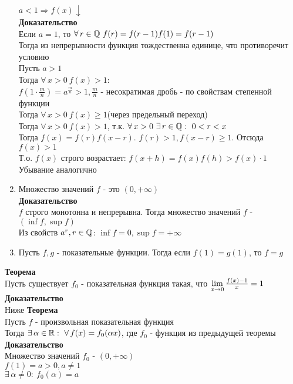 \documentclass[12pt]{article}
\begin{document}
\begin{enumerate}
    $a < 1 \Rightarrow f(x) \downarrow$\\
    \textbf{Доказательство}\\
    Если $a = 1$, то $\forall\, r \in \mathbb{Q}\ f(r) = f(r-1)f(1) = f(r-1)$\\
    Тогда из непрерывности функция тождественна единице, что противоречит условию\\
    Пусть $a > 1$\\
    Тогда $\forall\,x>0\ f(x) > 1$:\\
    $f(1\cdot\frac mn) = a^\frac mn > 1, \frac mn$ - несократимая дробь - по свойствам степенной функции\\
    Тогда $\forall\,x>0\ f(x) \geq 1$(через предельный переход)\\
    Тогда $\forall\,x>0\ f(x) > 1$, т.к. $\forall\,x>0\ \exists\,r\in\mathbb{Q}:\ 0 < r < x$\\
    Тогда $f(x) = f(r)f(x-r)$. $f(r) > 1, f(x-r) \geq 1$. Отсюда $f(x) > 1$\\
    Т.о. $f(x)$ строго возрастает: $f(x+h)=f(x)f(h) > f(x)\cdot 1$\\
    Убывание аналогично
    \item Множество значений $f$ - это $(0, +\infty)$\\
    \textbf{Доказательство}\\
    $f$ строго монотонна и непрерывна. Тогда множество значений $f$ - $(\inf f, \sup f)$\\
    Из свойств $a^r, r \in \mathbb{Q}$: $\inf f = 0, \sup f = +\infty$
    \item Пусть $f, g$ - показательные функции. Тогда если $f(1) = g(1)$, то $f = g$
\end{enumerate}
\textbf{Теорема}\\
Пусть существует $f_0$ - показательная функция такая, что $\lim\limits_{x\rightarrow 0} \frac{f(x)-1}{x} = 1$\\
\textbf{Доказательство}\\
Ниже
\textbf{Теорема}\\
Пусть $f$ - произвольная показательная функция\\
Тогда $\exists\,\alpha\in \bb{R}:\ \forall\,f(x)=f_0(\alpha x)$, где $f_0$ - функция из предыдущей теоремы\\
\textbf{Доказательство}\\
Множество значений $f_0$ - $(0, +\infty)$\\
$f(1) = a > 0, a \neq 1$\\
$\exists\,\alpha \neq 0:\ f_0(\alpha) = a$\\
\end{document}
